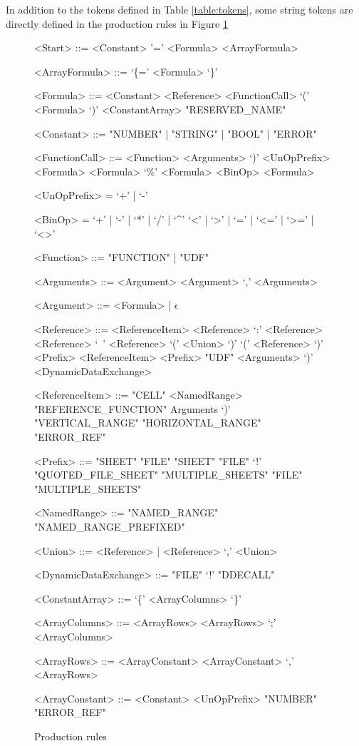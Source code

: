 \documentclass[conference]{IEEEtran}
\begin{document}
In addition to the tokens defined in Table \ref{table:tokens}, some string tokens are directly defined in the production rules in Figure \ref{figure:productions}

\begin{figure}
\centering
\label{figure:productions}
\caption{Production rules}
\begin{grammar}
<Start> ::= <Constant>
	\alt '=' <Formula>
	\alt <ArrayFormula>
	
<ArrayFormula> ::= `\{=' <Formula> `\}'

<Formula> ::= <Constant>
         \alt <Reference>
         \alt <FunctionCall>
         \alt `(' <Formula> `)'
         \alt <ConstantArray>
         \alt "RESERVED_NAME"
         
<Constant> ::= "NUMBER" | "STRING" | "BOOL" | "ERROR"
         
<FunctionCall> ::= <Function> <Arguments> `)'
		\alt <UnOpPrefix> <Formula>
		\alt <Formula> `\%'
		\alt <Formula> <BinOp> <Formula>
		
<UnOpPrefix> = `+' | `-'

<BinOp> = `+' | `-' | `*' | `/' | `\textasciicircum'
	\alt `<' | `>' | `=' | `<=' | `>=' | `<>'

<Function> ::= "FUNCTION" | "UDF"
	
<Arguments> ::= <Argument>
	\alt <Argument> `,' <Arguments>

<Argument> ::= <Formula> | $\epsilon$

<Reference> ::= <ReferenceItem>
	\alt <Reference> `:' <Reference>
	\alt <Reference> `\ ' <Reference>
	\alt `(' <Union> `)'
	\alt `(' <Reference> `)' 
	\alt <Prefix> <ReferenceItem>
    \alt <Prefix> "UDF" <Arguments> `)'
    \alt <DynamicDataExchange>
    
<ReferenceItem> ::= "CELL"
	\alt <NamedRange>
	\alt "REFERENCE_FUNCTION" Arguments `)'
	\alt "VERTICAL_RANGE"
	\alt "HORIZONTAL_RANGE"
	\alt "ERROR_REF"
	
<Prefix> ::= "SHEET"
	\alt "FILE" "SHEET"
	\alt "FILE" `!'
	\alt "QUOTED_FILE_SHEET"
	\alt "MULTIPLE_SHEETS"
	\alt "FILE" "MULTIPLE_SHEETS"
	
<NamedRange> ::= "NAMED_RANGE"
            \alt "NAMED_RANGE_PREFIXED"

<Union> ::= <Reference> | <Reference> `,' <Union>
	
<DynamicDataExchange> ::= "FILE" `!' "DDECALL"

<ConstantArray> ::= `\{' <ArrayColumns> `\}'

<ArrayColumns> ::= <ArrayRows>
	\alt <ArrayRows> `;' <ArrayColumns>

<ArrayRows> ::= <ArrayConstant>
	\alt <ArrayConstant> `,' <ArrayRows>
	
<ArrayConstant> ::= <Constant>
	\alt <UnOpPrefix> "NUMBER"
	\alt "ERROR_REF"

\end{grammar}
\end{figure}
\end{document}
